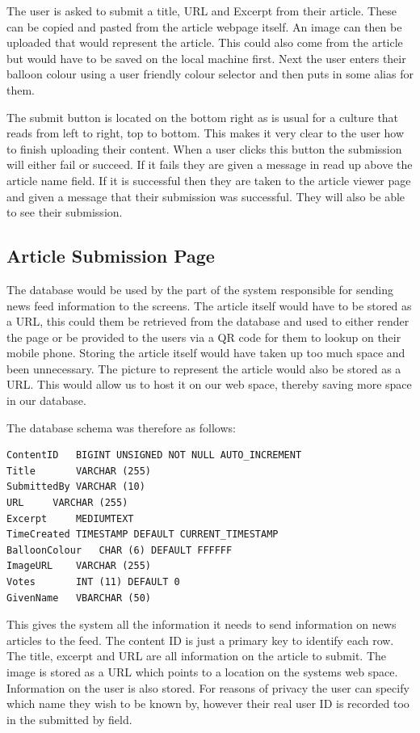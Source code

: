 The user is asked to submit a title, URL and Excerpt from their article. These can be copied and pasted from the article webpage itself. An image can then be uploaded that would represent the article. This could also come from the article but would have to be saved on the local machine first. Next the user enters their balloon colour using a user friendly colour selector and then puts in some alias for them. 

The submit button is located on the bottom right as is usual for a culture that reads from left to right, top to bottom. This makes it very clear to the user how to finish uploading their content. When a user clicks this button the submission will either fail or succeed. If it fails they are given a message in read up above the article name field. If it is successful then they are taken to the article viewer page and given a message that their submission was successful. They will also be able to see their submission.

\subsection{Article Submission Page}
The database would be used by the part of the system responsible for sending news feed information to the screens. The article itself would have to be stored as a URL, this could them be retrieved from the database and used to either render the page or be provided to the users via a QR code for them to lookup on their mobile phone. Storing the article itself would have taken up too much space and been unnecessary. The picture to represent the article would also be stored as a URL. This would allow us to host it on our web space, 
thereby saving more space in our database. 

The database schema was therefore as follows: 

\singlespacing
\begin{verbatim}ContentID	BIGINT UNSIGNED NOT NULL AUTO_INCREMENT
Title		VARCHAR (255)
SubmittedBy	VARCHAR (10)
URL		VARCHAR (255)
Excerpt		MEDIUMTEXT
TimeCreated	TIMESTAMP DEFAULT CURRENT_TIMESTAMP
BalloonColour	CHAR (6) DEFAULT FFFFFF
ImageURL	VARCHAR (255)
Votes		INT (11) DEFAULT 0
GivenName	VBARCHAR (50)\end{verbatim}
\onehalfspacing

This gives the system all the information it needs to send information on news articles to the feed. The content ID is just a primary key to identify each row. The title, excerpt and URL are all information on the article to submit. The image is stored as a URL which points to a location on the systems web space. Information on the user is also stored. For reasons of privacy the user can specify which name they wish to be known by, however their real user ID is recorded too in the submitted by field.

